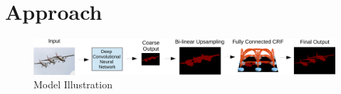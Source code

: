 \section{Approach}

\begin{figure}
  \centering
  \includegraphics[width=1\linewidth]{fig/model_illustration.pdf}
  \caption{Model Illustration}
  \label{fig:ModelIllustration}
\end{figure}




 


